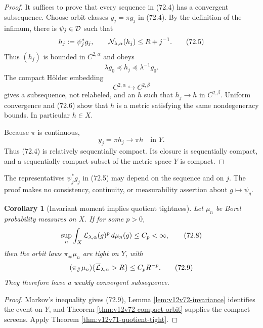 \documentclass[11pt]{article}
\newtheorem{corollary}[theorem]{Corollary}
\theoremstyle{remark}
\begin{document}
\begin{proof}
It suffices to prove that every sequence in (72.4) has a convergent
subsequence.  Choose orbit classes \(y_j=\pi g_j\) in (72.4).
By the definition of the infimum, there is
\(\psi_j\in{\cal D}\) such that
\begin{equation}
 h_j:=\psi_j^*g_j,\qquad
 {\cal N}_{\lambda,\alpha}(h_j)\leq R+j^{-1}.                \tag{72.5}
\end{equation}
Thus \((h_j)\) is bounded in \(C^{2,\alpha}\) and obeys
\[
                   \lambda g_0\preceq h_j
                   \preceq\lambda^{-1}g_0.                  \tag{72.6}
\]
The compact Hölder embedding
\[
 C^{2,\alpha}\hookrightarrow C^{2,\beta}
\]
gives a subsequence, not relabeled, and an \(h\) such that
\(h_j\to h\) in \(C^{2,\beta}\).  Uniform convergence and (72.6)
show that \(h\) is a metric satisfying the same nondegeneracy
bounds.  In particular \(h\in X\).

Because \(\pi\) is continuous,
\[
                         y_j=\pi h_j\longrightarrow\pi h
                         \quad\text{in }Y.                   \tag{72.7}
\]
Thus (72.4) is relatively sequentially compact.  Its closure is
sequentially compact, and a sequentially compact subset of the
metric space \(Y\) is compact.
\end{proof}

The representatives \(\psi_j^*g_j\) in (72.5) may depend on the
sequence and on \(j\).  The proof makes no consistency, continuity,
or measurability assertion about \(g\mapsto\psi_g\).

\begin{corollary}[Invariant moment implies quotient tightness]
\label{cor:v12v72-moment}
Let \(\mu_n\) be Borel probability measures on \(X\).  If for some
\(p>0\),
\begin{equation}
 \sup_n\int_X
 {\cal L}_{\lambda,\alpha}(g)^p\,d\mu_n(g)
 \leq C_p<\infty,                                           \tag{72.8}
\end{equation}
then the orbit laws \(\pi_\#\mu_n\) are tight on \(Y\), with
\begin{equation}
 (\pi_\#\mu_n)\{
 \overline{\cal L}_{\lambda,\alpha}>R\}
 \leq C_pR^{-p}.                                            \tag{72.9}
\end{equation}
They therefore have a weakly convergent subsequence.
\end{corollary}

\begin{proof}
Markov's inequality gives (72.9), Lemma
\ref{lem:v12v72-invariance} identifies the event on \(Y\), and
Theorem \ref{thm:v12v72-compact-orbit} supplies the compact screens.
Apply Theorem \ref{thm:v12v71-quotient-tight}.
\end{proof}
\end{document}
